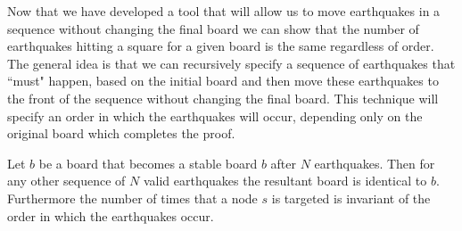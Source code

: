 \documentclass[runningheads,a4paper]{llncs}
\begin{document}
Now that we have developed a tool that will allow us to move earthquakes in a sequence without changing the final board we can show that the number of earthquakes hitting a square for a given board is the same regardless of order. 
The general idea is that we can recursively specify a sequence of earthquakes that ``must" happen, based on the initial board and then move these earthquakes to the front of the sequence without changing the final board. This technique will specify an order in which the earthquakes will occur, depending only on the original board which completes the proof.

\begin{theorem}
\label{thm:order}
Let $b$ be a board that becomes a stable board $b$ after $N$ earthquakes. Then for any other sequence of $N$ valid earthquakes the resultant board is identical to $b$. Furthermore the number of times that a node $s$ is targeted is invariant of the order in which the earthquakes occur. 
\end{theorem}
\end{document}
